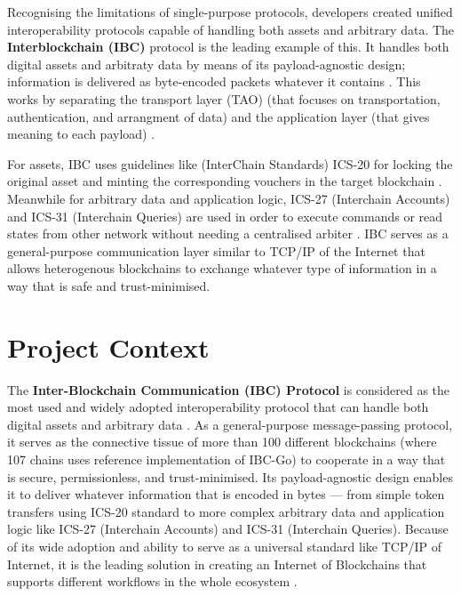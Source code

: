 Recognising the limitations of single-purpose protocols, developers
created unified interoperability protocols capable of handling both
assets and arbitrary data. The \textbf{Interblockchain (IBC)} protocol
is the leading example of this. It handles both digital assets and
arbitraty data by means of its payload-agnostic design; information is
delivered as byte-encoded packets whatever it contains
\citep{cosmos2024ibcintro} \citep{goes2020interblockchain}. This works
by separating the transport layer (TAO) (that focuses on transportation,
authentication, and arrangment of data) and the application layer (that
gives meaning to each payload) \citep{ibc2025howworks}.

For assets, IBC uses guidelines like (InterChain Standards) ICS-20 for
locking the original asset and minting the corresponding vouchers in the
target blockchain \citep{quasar2023litepaper}
\citep{ibc2024transportapp} \citep{goes2020interblockchain}. Meanwhile
for arbitrary data and application logic, ICS-27 (Interchain Accounts)
and ICS-31 (Interchain Queries) are used in order to execute commands or
read states from other network without needing a centralised arbiter
\citep{quasar2023litepaper} \citep{ibc2024transportapp}. IBC serves as a
general-purpose communication layer similar to TCP/IP of the Internet
that allows heterogenous blockchains to exchange whatever type of
information in a way that is safe and trust-minimised.

\section{Project Context}\label{project-context}

The \textbf{Inter-Blockchain Communication (IBC) Protocol} is considered
as the most used and widely adopted interoperability protocol that can
handle both digital assets and arbitrary data
\citep{ibc2024transportapp} \citep{Belchior_2021}. As a general-purpose
message-passing protocol, it serves as the connective tissue of more
than 100 different blockchains (where 107 chains uses reference
implementation of IBC-Go) to cooperate in a way that is secure,
permissionless, and trust-minimised. Its payload-agnostic design enables
it to deliver whatever information that is encoded in bytes --- from
simple token transfers using ICS-20 standard to more complex arbitrary
data and application logic like ICS-27 (Interchain Accounts) and ICS-31
(Interchain Queries). Because of its wide adoption and ability to serve
as a universal standard like TCP/IP of Internet, it is the leading
solution in creating an Internet of Blockchains that supports different
workflows in the whole ecosystem \citep{kishore2025interoperability}.

